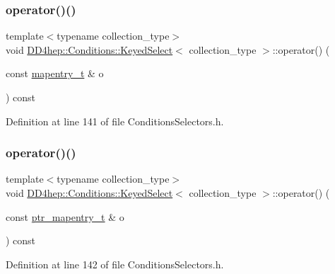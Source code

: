 \subsubsection{\texorpdfstring{operator()()}{operator()()}\hspace{0.1cm}{\footnotesize\ttfamily [3/4]}}
{\footnotesize\ttfamily template$<$typename collection\+\_\+type$>$ \\
void \hyperlink{class_d_d4hep_1_1_conditions_1_1_keyed_select}{D\+D4hep\+::\+Conditions\+::\+Keyed\+Select}$<$ collection\+\_\+type $>$\+::operator() (\begin{DoxyParamCaption}\item[{const \hyperlink{class_d_d4hep_1_1_conditions_1_1_cond_____oper_a877dac3da66795207aed15be219acbdc}{mapentry\+\_\+t} \&}]{o }\end{DoxyParamCaption}) const\hspace{0.3cm}{\ttfamily [inline]}}



Definition at line 141 of file Conditions\+Selectors.\+h.

\hypertarget{class_d_d4hep_1_1_conditions_1_1_keyed_select_a96f8e463757514984a4a3e312887a5b6}{}\label{class_d_d4hep_1_1_conditions_1_1_keyed_select_a96f8e463757514984a4a3e312887a5b6} 
\subsubsection{\texorpdfstring{operator()()}{operator()()}\hspace{0.1cm}{\footnotesize\ttfamily [4/4]}}
{\footnotesize\ttfamily template$<$typename collection\+\_\+type$>$ \\
void \hyperlink{class_d_d4hep_1_1_conditions_1_1_keyed_select}{D\+D4hep\+::\+Conditions\+::\+Keyed\+Select}$<$ collection\+\_\+type $>$\+::operator() (\begin{DoxyParamCaption}\item[{const \hyperlink{class_d_d4hep_1_1_conditions_1_1_cond_____oper_a0949e4bd5f90cd3fae2394cf30983973}{ptr\+\_\+mapentry\+\_\+t} \&}]{o }\end{DoxyParamCaption}) const\hspace{0.3cm}{\ttfamily [inline]}}



Definition at line 142 of file Conditions\+Selectors.\+h.



